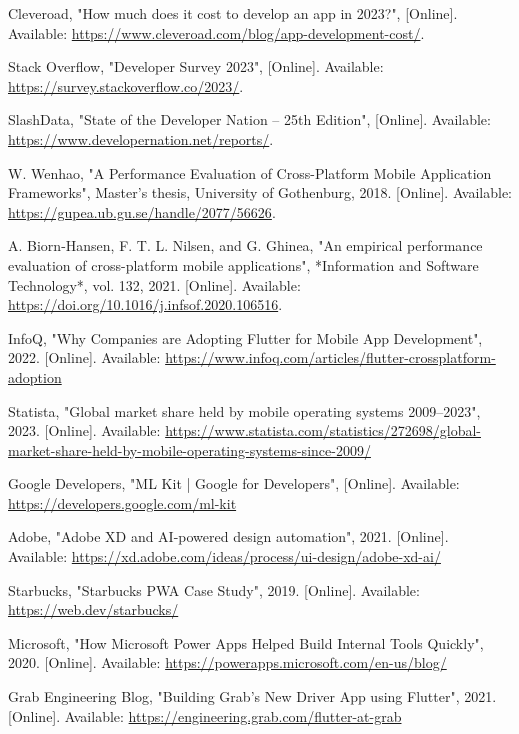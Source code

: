 \documentclass[12pt]{report}
\begin{document}
\begin{thebibliography}{1}
    Cleveroad, "How much does it cost to develop an app in 2023?", [Online]. Available: \url{https://www.cleveroad.com/blog/app-development-cost/}.
    
    Stack Overflow, "Developer Survey 2023", [Online]. Available: \url{https://survey.stackoverflow.co/2023/}.
    
    SlashData, "State of the Developer Nation – 25th Edition", [Online]. Available: \url{https://www.developernation.net/reports/}.
    
    W. Wenhao, "A Performance Evaluation of Cross-Platform Mobile Application Frameworks", Master’s thesis, University of Gothenburg, 2018. [Online]. Available: \url{https://gupea.ub.gu.se/handle/2077/56626}.
    
    A. Biorn-Hansen, F. T. L. Nilsen, and G. Ghinea, "An empirical performance evaluation of cross-platform mobile applications", *Information and Software Technology*, vol. 132, 2021. [Online]. Available: \url{https://doi.org/10.1016/j.infsof.2020.106516}.
    
InfoQ, "Why Companies are Adopting Flutter for Mobile App Development", 2022. [Online]. Available: \url{https://www.infoq.com/articles/flutter-crossplatform-adoption}

Statista, "Global market share held by mobile operating systems 2009–2023", 2023. [Online]. Available: \url{https://www.statista.com/statistics/272698/global-market-share-held-by-mobile-operating-systems-since-2009/}

Google Developers, "ML Kit | Google for Developers", [Online]. Available: \url{https://developers.google.com/ml-kit}

Adobe, "Adobe XD and AI-powered design automation", 2021. [Online]. Available: \url{https://xd.adobe.com/ideas/process/ui-design/adobe-xd-ai/}

Starbucks, "Starbucks PWA Case Study", 2019. [Online]. Available: \url{https://web.dev/starbucks/}

Microsoft, "How Microsoft Power Apps Helped Build Internal Tools Quickly", 2020. [Online]. Available: \url{https://powerapps.microsoft.com/en-us/blog/}

Grab Engineering Blog, "Building Grab’s New Driver App using Flutter", 2021. [Online]. Available: \url{https://engineering.grab.com/flutter-at-grab}


\end{thebibliography}
\end{document}

